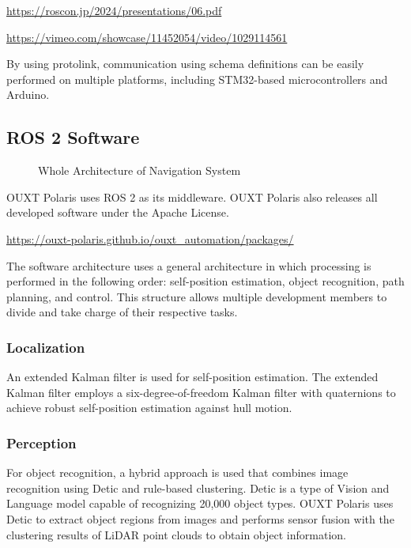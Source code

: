 \documentclass[lettersize,journal]{IEEEtran}
\begin{document}
\url{https://roscon.jp/2024/presentations/06.pdf}

\url{https://vimeo.com/showcase/11452054/video/1029114561}

By using protolink, communication using schema definitions can be easily performed on multiple platforms, including STM32-based microcontrollers and Arduino.

\subsection{ROS 2 Software}

\begin{figure}[H]
  \begin{center}
  \end{center}
  \caption{Whole Architecture of Navigation System}
  \label{fig:arch_nav}
\end{figure}

OUXT Polaris uses ROS 2 as its middleware.
OUXT Polaris also releases all developed software under the Apache License.

\url{https://ouxt-polaris.github.io/ouxt_automation/packages/}

The software architecture uses a general architecture in which processing is performed in the following order: self-position estimation, object recognition, path planning, and control.
This structure allows multiple development members to divide and take charge of their respective tasks.

\subsubsection{Localization}

An extended Kalman filter is used for self-position estimation.
The extended Kalman filter employs a six-degree-of-freedom Kalman filter with quaternions to achieve robust self-position estimation against hull motion.

\subsubsection{Perception}

For object recognition, a hybrid approach is used that combines image recognition using Detic and rule-based clustering.
Detic is a type of Vision and Language model capable of recognizing 20,000 object types.
OUXT Polaris uses Detic to extract object regions from images and performs sensor fusion with the clustering results of LiDAR point clouds to obtain object information.
\end{document}
